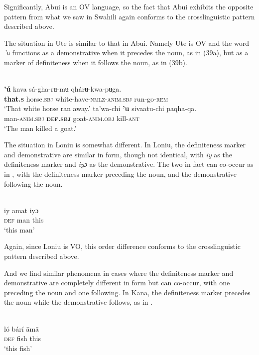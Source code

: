 \documentclass[output=paper]{langsci/langscibook}
\begin{document}
Significantly, Abui is an OV language, so the fact that Abui exhibits the opposite pattern from what we saw in Swahili again conforms to the crosslinguistic pattern described above.

The situation in Ute is similar to that in Abui. Namely Ute is OV and the word \textit{'u} functions as a demonstrative when it precedes the noun, as in (39a), but as a marker of definiteness when it follows the noun, as in (39b).

\ea\label{ex:dryer:}
\\
\ea
\gll     \textbf{'ú}  kava  sá-gha-rʉ-mʉ  qhárʉ-kwa-pʉga.\\
         \textbf{that.\textsc{s}}  horse.\textsc{sbj}  white-have-\textsc{nmlz-anim.sbj}  run-go-\textsc{rem}\\
\glt     ‘That white horse ran away.’
\ex
\gll    ta'wa-chi  \textbf{'u}  sivaatu-chi  paqha-qa.\\
         man-\textsc{anim.sbj}  \textbf{\textsc{def.sbj}}  goat-\textsc{anim.obj}  kill-\textsc{ant}\\
\glt     ‘The man killed a goat.’
\z
\z

The situation in Loniu is somewhat different. In Loniu, the definiteness marker and demonstrative are similar in form, though not identical, with \textit{iy} as the definiteness marker and \textit{iyɔ} as the demonstrative. The two in fact can co-occur as in , with the definiteness marker preceding the noun, and the demonstrative following the noun.

\ea\label{ex:dryer:}
\\
\gll   iy   amat   iyɔ\\
       \textsc{def}   man   this \\
\glt   ‘this man’
\z

Again, since Loniu is VO, this order difference conforms to the crosslinguistic pattern described above.

And we find similar phenomena in cases where the definiteness marker and demonstrative are completely different in form but can co-occur, with one preceding the noun and one following. In Kana, the definiteness marker precedes the noun while the demonstrative follows, as in .

\ea\label{ex:dryer:}
\\
\gll   ló   bárí   āmā \\
       \textsc{def}   fish   this \\
\glt   ‘this fish’
\z
\end{document}
